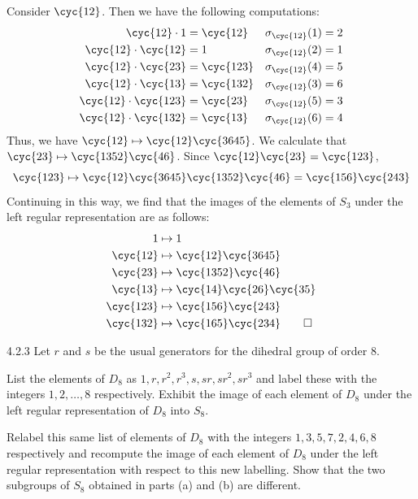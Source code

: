 \begin{sol}
	Consider $\cyc{1 2}$.
	Then we have the following computations:
	\begin{align*}
		\cyc{1 2} \cdot 1 & = \cyc{1 2} && \sigma_{\cyc{1 2}}(1) = 2 \\
		\cyc{1 2} \cdot \cyc{1 2} & = 1 && \sigma_{\cyc{1 2}}(2) = 1 \\
		\cyc{1 2} \cdot \cyc{2 3} & = \cyc{1 2 3} && \sigma_{\cyc{1 2}}(4) = 5 \\
		\cyc{1 2} \cdot \cyc{1 3} & = \cyc{1 3 2} && \sigma_{\cyc{1 2}}(3) = 6 \\
		\cyc{1 2} \cdot \cyc{1 2 3} & = \cyc{2 3} && \sigma_{\cyc{1 2}}(5) = 3 \\
		\cyc{1 2} \cdot \cyc{1 3 2} & = \cyc{1 3} && \sigma_{\cyc{1 2}}(6) = 4
	\end{align*}
	Thus, we have $\cyc{1 2} \mapsto \cyc{1 2}\cyc{3 6 4 5}$.
	We calculate that $\cyc{2 3} \mapsto \cyc{1 3 5 2}\cyc{4 6}$.
	Since $\cyc{1 2}\cyc{2 3} = \cyc{1 2 3}$,
	\[
		\cyc{1 2 3} \mapsto \cyc{1 2}\cyc{3 6 4 5}\cyc{1 3 5 2}\cyc{4 6} = \cyc{1 5 6}\cyc{2 4 3}
	\]
	Continuing in this way, we find that the images of the elements of $S_3$ under the left regular representation are as follows:
	\begin{align*}
		1 & \mapsto 1 \\
		\cyc{1 2} & \mapsto \cyc{1 2}\cyc{3 6 4 5} \\
		\cyc{2 3} & \mapsto \cyc{1 3 5 2}\cyc{4 6} \\
		\cyc{1 3} & \mapsto \cyc{1 4}\cyc{2 6}\cyc{3 5} \\
		\cyc{1 2 3} & \mapsto \cyc{1 5 6}\cyc{2 4 3} \\
		\cyc{1 3 2} & \mapsto \cyc{1 6 5}\cyc{2 3 4} \qedhere
	\end{align*}
\end{sol}

\begin{exercise}{4.2.3}
	Let $r$ and $s$ be the usual generators for the dihedral group of order 8.
	\begin{subexercises}
		\item List the elements of $D_8$ as $1, r, r^2, r^3, s, sr, sr^2, sr^3$ and label these with the integers $1,2,\dots,8$ respectively.
		Exhibit the image of each element of $D_8$ under the left regular representation of $D_8$ into $S_8$.
		\item Relabel this same list of elements of $D_8$ with the integers $1,3,5,7,2,4,6,8$ respectively and recompute the image of each element of $D_8$ under the left regular representation with respect to this new labelling.
		Show that the two subgroups of $S_8$ obtained in parts (a) and (b) are different.
	\end{subexercises}
\end{exercise}

